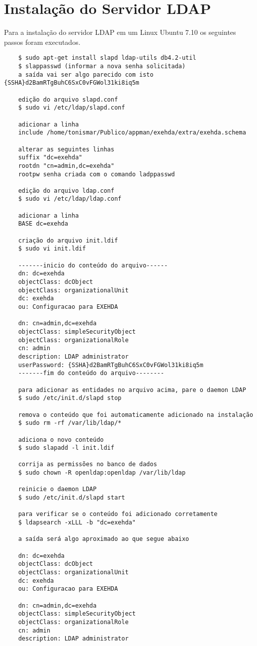 \chapter{Instalação do Servidor LDAP}
\label{anexo:ldap}

Para a instalação do servidor LDAP em um Linux Ubuntu 7.10 os seguintes passos foram executados.

\begin{scriptsize}
\begin{verbatim}
	$ sudo apt-get install slapd ldap-utils db4.2-util
	$ slappasswd (informar a nova senha solicitada)
	a saída vai ser algo parecido com isto {SSHA}d2BamRTgBuhC6SxC0vFGWol31ki8iq5m
	
	edição do arquivo slapd.conf
	$ sudo vi /etc/ldap/slapd.conf
	
	adicionar a linha
	include /home/tonismar/Publico/appman/exehda/extra/exehda.schema
	
	alterar as seguintes linhas
	suffix "dc=exehda"
	rootdn "cn=admin,dc=exehda"
	rootpw senha criada com o comando ladppasswd
	
	edição do arquivo ldap.conf
	$ sudo vi /etc/ldap/ldap.conf
	
	adicionar a linha
	BASE dc=exehda
	
	criação do arquivo init.ldif
	$ sudo vi init.ldif
	
	-------inicio do conteúdo do arquivo------
	dn: dc=exehda
	objectClass: dcObject
	objectClass: organizationalUnit
	dc: exehda
	ou: Configuracao para EXEHDA
	
	dn: cn=admin,dc=exehda
	objectClass: simpleSecurityObject
	objectClass: organizationalRole
	cn: admin
	description: LDAP administrator
	userPassword: {SSHA}d2BamRTgBuhC6SxC0vFGWol31ki8iq5m
	-------fim do conteúdo do arquivo--------
	
	para adicionar as entidades no arquivo acima, pare o daemon LDAP
	$ sudo /etc/init.d/slapd stop
	
	remova o conteúdo que foi automaticamente adicionado na instalação
	$ sudo rm -rf /var/lib/ldap/*
	
	adiciona o novo conteúdo
	$ sudo slapadd -l init.ldif
	
	corrija as permissões no banco de dados
	$ sudo chown -R openldap:openldap /var/lib/ldap
	
	reinicie o daemon LDAP
	$ sudo /etc/init.d/slapd start
	
	para verificar se o conteúdo foi adicionado corretamente
	$ ldapsearch -xLLL -b "dc=exehda"
	
	a saída será algo aproximado ao que segue abaixo
	
	dn: dc=exehda
	objectClass: dcObject
	objectClass: organizationalUnit
	dc: exehda
	ou: Configuracao para EXEHDA

	dn: cn=admin,dc=exehda
	objectClass: simpleSecurityObject
	objectClass: organizationalRole
	cn: admin
	description: LDAP administrator

\end{verbatim}


\end{scriptsize}